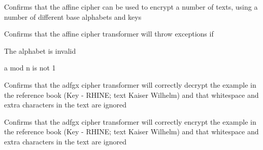 \begin{DoxyRefList}
\item[\label{test__test000005}%
\hypertarget{test__test000005}{}%
Member \hyperlink{test__affine_8cpp_a06dd8303511720b9057859a8536a5768}{T\+E\+S\+T\+\_\+\+C\+A\+SE} (\char`\"{}\+Affine cipher encrypt\char`\"{})]Confirms that the affine cipher can be used to encrypt a number of texts, using a number of different base alphabets and keys  
\item[\label{test__test000004}%
\hypertarget{test__test000004}{}%
Member \hyperlink{test__affine_8cpp_abcc371f63c29e3fba4262fe9e41a9124}{T\+E\+S\+T\+\_\+\+C\+A\+SE} (\char`\"{}\+Affine cipher errors\char`\"{})]Confirms that the affine cipher transformer will throw exceptions if
\begin{DoxyItemize}
\item The alphabet is invalid
\item a mod n is not 1  
\end{DoxyItemize}
\item[\label{test__test000003}%
\hypertarget{test__test000003}{}%
Member \hyperlink{test__adfgx_8cpp_a230d08f42a13dbaa77f688fb21d4ad8a}{T\+E\+S\+T\+\_\+\+C\+A\+SE} (\char`\"{}\+A\+D\+F\+G\+X cipher decrypt\char`\"{})]Confirms that the adfgx cipher transformer will correctly decrypt the example in the reference book (Key -\/ R\+H\+I\+NE; text Kaiser Wilhelm) and that whitespace and extra characters in the text are ignored  
\item[\label{test__test000002}%
\hypertarget{test__test000002}{}%
Member \hyperlink{test__adfgx_8cpp_ae05e4b83acb2d84bfafca0790744e8a8}{T\+E\+S\+T\+\_\+\+C\+A\+SE} (\char`\"{}\+A\+D\+F\+G\+X cipher encrypt\char`\"{})]Confirms that the adfgx cipher transformer will correctly encrypt the example in the reference book (Key -\/ R\+H\+I\+NE; text Kaiser Wilhelm) and that whitespace and extra characters in the text are ignored 
\end{DoxyRefList}